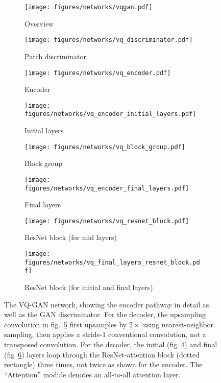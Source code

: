 \documentclass[11pt, a4paper, logo, copyright, numbering]{googledeepmind}
\begin{document}
\begin{figure}
    \centering
    \begin{subfigure}[t]{.6\textwidth}
        \centering
        \texttt{[image: figures/networks/vqgan.pdf]}
        \caption{Overview\label{fig:vq:vqgan}}
    \end{subfigure}
    \hfill
    \begin{subfigure}[t]{.29\textwidth}
        \centering
        \texttt{[image: figures/networks/vq\_discriminator.pdf]}
        \caption{Patch discriminator\label{fig:vq:discriminator}}
    \end{subfigure}
    \par\bigskip \begin{subfigure}[c]{.3\textwidth}
        \centering
        \texttt{[image: figures/networks/vq\_encoder.pdf]}
        \caption{Encoder \label{fig:vq:enc}}
    \end{subfigure}
    \hfill
    \begin{subfigure}[c]{.3\textwidth}
        \centering
        \texttt{[image: figures/networks/vq\_encoder\_initial\_layers.pdf]}
        \caption{Initial layers \label{fig:vq:enc:initial_layers}}
    \end{subfigure}
    \hfill
    \begin{subfigure}[c]{.3\textwidth}
        \centering
        \texttt{[image: figures/networks/vq\_block\_group.pdf]}
        \caption{Block group \label{fig:vq:enc:block_group}}
    \end{subfigure}
\par\bigskip \begin{subfigure}[c]{.3\textwidth}
        \centering
        \texttt{[image: figures/networks/vq\_encoder\_final\_layers.pdf]}
        \caption{Final layers \label{fig:vq:enc:final_layers}}
    \end{subfigure}
    \hfill
    \begin{subfigure}[c]{0.3\textwidth}
        \centering
        \texttt{[image: figures/networks/vq\_resnet\_block.pdf]}
        \caption{ResNet block (for mid layers)\label{fig:vq:enc:mid:resnet_block}}
    \end{subfigure}
    \hfill \begin{subfigure}[c]{0.3\textwidth}
        \centering
        \texttt{[image: figures/networks/vq\_final\_layers\_resnet\_block.pdf]}
        \caption{ResNet block (for initial and final layers)\label{fig:vq:enc:final:resnet_block}}
    \end{subfigure}
\caption{The VQ-GAN network, showing the encoder pathway in detail as well as the GAN discriminator. For the decoder, the upsampling convolution in fig.~\ref{fig:vq:enc:block_group} first upsamples by $2\times$ using nearest-neighbor sampling, then applies a stride-1 conventional convolution, not a transposed convolution. For the decoder, the initial (fig~\ref{fig:vq:enc:initial_layers}) and final (fig~\ref{fig:vq:enc:final_layers}) layers loop through the ResNet-attention block (dotted rectangle) three times, not twice as shown for the encoder. The ``Attention'' module denotes an all-to-all attention layer. 
    \label{fig:vq}}
\end{figure}
\end{document}
